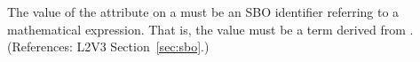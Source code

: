 The value of the  attribute on a \Delay must be an SBO
identifier referring to a mathematical expression.  That is, the value
must be a term derived from \sbomathformula.  (References: 
L2V3 Section~\ref{sec:sbo}.)
